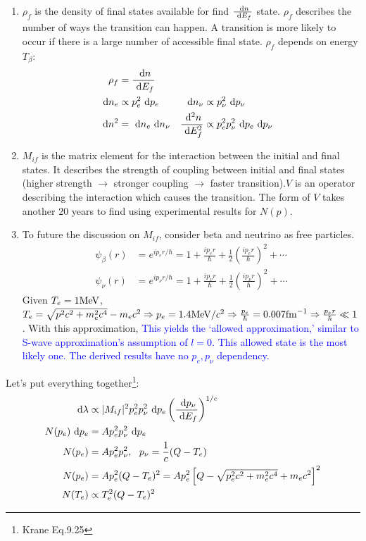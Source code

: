 \documentclass{school-22.101-notes}
\begin{document}
\begin{enumerate}
\item $\rho_{f}$ is the density of final states available for find $\frac{\mbox{ }\mathrm{d} n}{\mbox{ }\mathrm{d} E_f}$ state. $\rho_f$ describes the number of ways the transition can happen. A transition is more likely to occur if there is a large number of accessible final state. $\rho_f$ depends on energy $T_{\beta}$: 
\begin{align}
\rho_f &= \frac{\mbox{ }\mathrm{d} n}{\mbox{ }\mathrm{d} E_f} \\ 
\mbox{ }\mathrm{d} n_{e} &\propto p_{e}^2  \mbox{ }\mathrm{d} p_{e} & \mbox{ }\mathrm{d} n_{\nu} &\propto p_{\nu}^2 \mbox{ }\mathrm{d} p_{\nu} \\
\mbox{ }\mathrm{d} n^2 &= \mbox{ }\mathrm{d} n_{e} \mbox{ }\mathrm{d} n_{\nu} & \frac{\mbox{ }\mathrm{d}^2 n}{\mbox{ }\mathrm{d} E_f^2} &\propto p_{e}^2 p_{\nu}^2 \mbox{ }\mathrm{d} p_{e} \mbox{ }\mathrm{d} p_{\nu}  
\end{align}
%
\item $M_{if}$ is the matrix element for the interaction between the initial and final states. It describes the strength of coupling between initial and final states (higher strength $\to$ stronger coupling $\to$ faster transition).$V$ is an operator describing the interaction which causes the transition. The form of $V$ takes another 20 years to find using experimental results for $N(p)$.
\item To future the discussion on $M_{if}$, consider beta and neutrino as free particles. 
\begin{align}
\psi_{\beta} (r) &= e^{i p_{e} r /\hbar} = 1+ \frac{i p_{e} r }{\hbar} + \frac{1}{2} \left(\frac{i p_{e} r }{\hbar} \right)^2 + \cdots \label{beta-wavefunction}\\
\psi_{\nu} (r) &= e^{i p_{\nu} r /\hbar} = 1+ \frac{i p_{\nu} r }{\hbar} + \frac{1}{2} \left(\frac{i p_{\nu} r }{\hbar} \right)^2 + \cdots 
\end{align}
Given $T_{e} = 1 \mathrm{MeV}$, $T_e = \sqrt{p^2 c^2 + m_e^2 c^4} - m_e c^2 \Rightarrow p_{e} = 1.4 \mathrm{MeV}/c^2 \Rightarrow \frac{p_{e}}{\hbar} = 0.007 \mathrm{fm}^{-1} \Rightarrow \frac{p_e r}{\hbar} \ll 1$. With this approximation,
\textcolor{blue}{This yields the `allowed approximation,' similar to S-wave approximation's assumption of $l=0$. This allowed state is the most likely one. The derived results have no $p_e, p_{\nu}$ dependency.}
\end{enumerate}
Let's put everything together\footnote{Krane Eq.9.25}: 
\begin{align}
\mbox{ }\mathrm{d} \lambda &\propto |M_{if}|^2 p_{e}^2 p_{\nu}^2 \mbox{ }\mathrm{d} p_{e} \left(\frac{\mbox{ }\mathrm{d} p_{\nu}}{\mbox{ }\mathrm{d} E_f} \right)^{1/c} \\
N(p_{e}) \mbox{ }\mathrm{d} p_{e} &= A p_{e}^2 p_{\nu}^2 \mbox{ }\mathrm{d} p_{e} \\
N(p_{e}) &= A p_{e}^2 p_{\nu}^2, \mbox{ } \mbox{ } p_{\nu} =\frac{1}{c} (Q - T_{e}) \\
N(p_{e}) &= A p_{e}^2 (Q - T_{e})^2  = A p_{e}^2 \left[ Q - \sqrt{p_{e}^2 c^2 + m_e^2 c^4} + m_e c^2 \right]^2 \\
N(T_{e}) &\propto T_{e}^2 (Q - T_{e})^2
\end{align}
\end{document}
